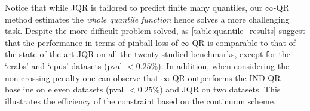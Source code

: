 %
Notice that while \ac{JQR} is tailored to predict finite many quantiles, our
$\infty$-\ac{QR} method estimates the \emph{whole quantile function} hence
solves a more challenging task.  Despite the more difficult problem solved, as
\cref{table:quantile_results} suggest that the performance in terms of pinball
loss of $\infty$-\ac{QR} is comparable to that of the state-of-the-art JQR on
all the twenty studied benchmarks, except for the `crabs' and `cpus' datasets
(\acs{pval} $<0.25\%$). In addition, when considering the non-crossing penalty
one can observe that $\infty$-\ac{QR} outperforms the IND-\ac{QR} baseline on
eleven datasets (\acs{pval} $<0.25\%$) and \ac{JQR} on two datasets. This
illustrates the efficiency of the constraint based on the continuum scheme.
%
